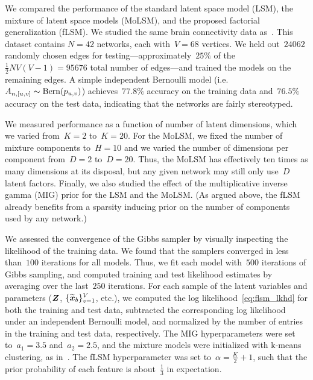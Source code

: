 We compared the performance of the standard latent space model (LSM),
the mixture of latent space models (MoLSM), and the proposed factorial
generalization (fLSM). We studied the same brain connectivity
data as~\citet{durante2016nonparametric}. This dataset
contains ${N=42}$ networks, each with~${V=68}$ vertices.  We held
out~$24062$ randomly chosen edges for testing---approximately~$25\%$ of the
${\tfrac{1}{2}NV(V-1) = 95676}$ total number of edges---and trained
the models on the remaining edges. A simple independent Bernoulli model
(i.e.~${A_{n,[u,v]} \sim \mathrm{Bern}(p_{u,v})}$) achieves~$77.8\%$
accuracy on the training data and~$76.5\%$ accuracy on the test data,
indicating that the networks are fairly stereotyped.

We measured performance as a function of number of latent dimensions,
which we varied from~$K=2$ to~$K=20$.  For the MoLSM, we fixed the
number of mixture components to~${H=10}$ and we varied the number of
dimensions per component from~$D=2$ to~$D=20$.  Thus, the MoLSM has
effectively ten times as many dimensions at its disposal, but
any given network may still only use~$D$ latent factors. Finally, we also
studied the effect of the multiplicative inverse gamma (MIG) prior for the
LSM and the MoLSM. (As argued above, the fLSM already benefits from a
sparsity inducing prior on the number of components used by any
network.)

We assessed the convergence of the Gibbs sampler by visually inspecting
the likelihood of the training data. We found that the samplers converged 
in less than~$100$ iterations for all models. Thus, we fit each model
with~$500$ iterations of Gibbs sampling, and computed training and test
likelihood 
estimates by averaging over the last~$250$ iterations.
For
each sample of the latent variables and parameters ($\boldsymbol{Z}$,
$\{\widetilde{\boldsymbol{x}}_b\}_{v=1}^V$, etc.), we computed the log
likelihood~\eqref{eq:flsm_lkhd} for both the training and test
data, subtracted the corresponding log likelihood under an independent
Bernoulli model, and normalized by the number of entries in the training
and test data, respectively. 
The MIG hyperparameters were set to~$a_1=3.5$ and~$a_2=2.5$, and the
mixture models were initialized with k-means clustering, as in~\citet{durante2016nonparametric}. The fLSM
hyperparameter was set to~${\alpha = \tfrac{K}{2}+1}$, such that the
prior probability of each feature is about~$\tfrac{1}{3}$ in expectation.

